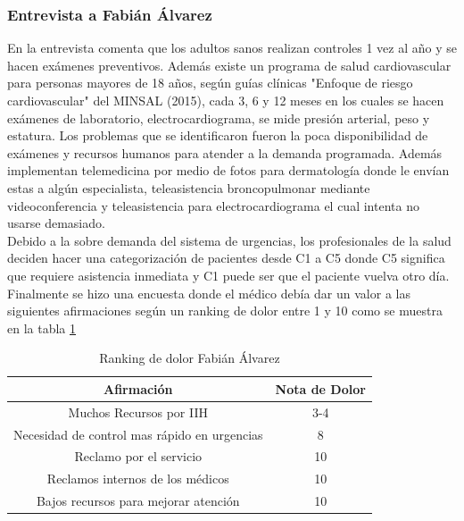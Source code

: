 \subsubsection{Entrevista a Fabián Álvarez}
En la entrevista comenta que los adultos sanos realizan controles 1 vez al año y se hacen exámenes preventivos. Además existe un programa de salud cardiovascular para personas mayores de 18 años, según guías clínicas "Enfoque de riesgo cardiovascular" del MINSAL (2015), cada 3, 6 y 12 meses en los cuales se hacen exámenes de laboratorio, electrocardiograma, se mide presión arterial, peso y estatura. 
Los problemas que se identificaron fueron la poca disponibilidad de exámenes y recursos humanos para atender a la demanda programada. Además implementan telemedicina por medio de fotos para dermatología donde le envían estas a algún especialista, teleasistencia broncopulmonar mediante videoconferencia y teleasistencia para electrocardiograma el cual intenta no usarse demasiado.\\
Debido a la sobre demanda del sistema de urgencias, los profesionales de la salud deciden hacer una categorización de pacientes desde C1 a C5 donde C5 significa que requiere asistencia inmediata y C1 puede ser que el paciente vuelva otro día.\\
Finalmente se hizo una encuesta donde el médico debía dar un valor a las siguientes afirmaciones según un ranking de dolor entre 1 y 10 como se muestra en la tabla \ref{fabian}
\newpage
\begin{table}[H]
\centering
\begin{tabular}{| c | c |}
\hline
\multicolumn{1}{|c|}{\textbf{Afirmación}}&
\multicolumn{1}{|c|}{\textbf{Nota de Dolor}}\\ \hline
Muchos Recursos por IIH  & 3-4  \\ \hline
Necesidad de control mas rápido en urgencias & 8 \\ \hline
Reclamo por el servicio  & 10  \\ \hline
Reclamos internos de los médicos & 10\\ \hline
Bajos recursos para mejorar atención & 10\\ \hline
\end{tabular}
\caption{Ranking de dolor Fabián Álvarez}
\label{fabian}
\end{table}


